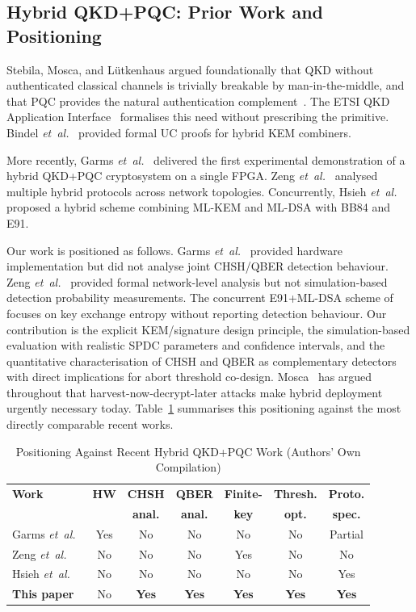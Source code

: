 \documentclass[conference]{IEEEtran}
\begin{document}
\subsection{Hybrid QKD+PQC: Prior Work and Positioning}
Stebila, Mosca, and L\"utkenhaus argued foundationally that QKD without authenticated classical channels is trivially breakable by man-in-the-middle, and that PQC provides the natural authentication complement~\cite{stebila2010}. The ETSI QKD Application Interface~\cite{etsi2020} formalises this need without prescribing the primitive. Bindel \emph{et~al.}~\cite{bindel2019} provided formal UC proofs for hybrid KEM combiners.

More recently, Garms \emph{et~al.}~\cite{garms2024} delivered the first experimental demonstration of a hybrid QKD+PQC cryptosystem on a single FPGA. Zeng \emph{et~al.}~\cite{zeng2024} analysed multiple hybrid protocols across network topologies. Concurrently, Hsieh \emph{et~al.}~\cite{hsieh2025} proposed a hybrid scheme combining ML-KEM and ML-DSA with BB84 and E91.

Our work is positioned as follows. Garms \emph{et~al.}~\cite{garms2024} provided hardware implementation but did not analyse joint CHSH/QBER detection behaviour. Zeng \emph{et~al.}~\cite{zeng2024} provided formal network-level analysis but not simulation-based detection probability measurements. The concurrent E91+ML-DSA scheme of~\cite{hsieh2025} focuses on key exchange entropy without reporting detection behaviour. Our contribution is the explicit KEM/signature design principle, the simulation-based evaluation with realistic SPDC parameters and confidence intervals, and the quantitative characterisation of CHSH and QBER as complementary detectors with direct implications for abort threshold co-design. Mosca~\cite{mosca2018} has argued throughout that harvest-now-decrypt-later attacks make hybrid deployment urgently necessary today. Table~\ref{tab:positioning} summarises this positioning against the most directly comparable recent works.

\begin{table}[!t]
\caption{Positioning Against Recent Hybrid QKD+PQC Work (Authors' Own Compilation)}
\label{tab:positioning}
\centering
\small
\begin{tabular}{@{}lcccccc@{}}
\toprule
\textbf{Work} & \textbf{HW} & \textbf{CHSH} & \textbf{QBER} & \textbf{Finite-} & \textbf{Thresh.} & \textbf{Proto.} \\
 & & \textbf{anal.} & \textbf{anal.} & \textbf{key} & \textbf{opt.} & \textbf{spec.} \\
\midrule
Garms \emph{et~al.}~\cite{garms2024} & Yes & No & No & No & No & Partial \\
Zeng \emph{et~al.}~\cite{zeng2024} & No & No & No & Yes & No & No \\
Hsieh \emph{et~al.}~\cite{hsieh2025} & No & No & No & No & No & Yes \\
\textbf{This paper} & No & \textbf{Yes} & \textbf{Yes} & \textbf{Yes} & \textbf{Yes} & \textbf{Yes} \\
\bottomrule
\end{tabular}
\end{table}
\end{document}
